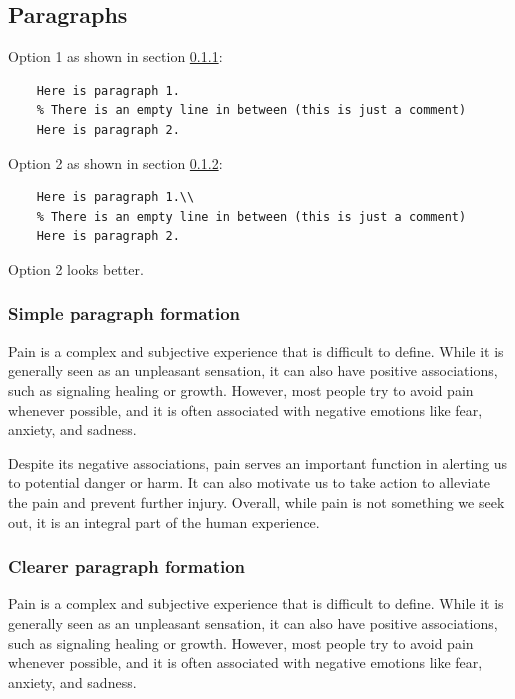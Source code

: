 

\subsection{Paragraphs}

Option 1 as shown in section \ref{sec:simple-paragraph}:

\begin{verbatim}
    Here is paragraph 1.
    % There is an empty line in between (this is just a comment)
    Here is paragraph 2.
\end{verbatim}

Option 2 as shown in section \ref{sec:clear-paragraph}:

\begin{verbatim}
    Here is paragraph 1.\\
    % There is an empty line in between (this is just a comment)
    Here is paragraph 2.
\end{verbatim}

Option 2 looks better.


\subsubsection{Simple paragraph formation} \label{sec:simple-paragraph}

Pain is a complex and subjective experience that is difficult to define. While it is generally seen as an unpleasant sensation, it can also have positive associations, such as signaling healing or growth. However, most people try to avoid pain whenever possible, and it is often associated with negative emotions like fear, anxiety, and sadness. %

Despite its negative associations, pain serves an important function in alerting us to potential danger or harm. It can also motivate us to take action to alleviate the pain and prevent further injury. Overall, while pain is not something we seek out, it is an integral part of the human experience.

\subsubsection{Clearer paragraph formation} \label{sec:clear-paragraph}

Pain is a complex and subjective experience that is difficult to define. While it is generally seen as an unpleasant sensation, it can also have positive associations, such as signaling healing or growth. However, most people try to avoid pain whenever possible, and it is often associated with negative emotions like fear, anxiety, and sadness.\\ %

